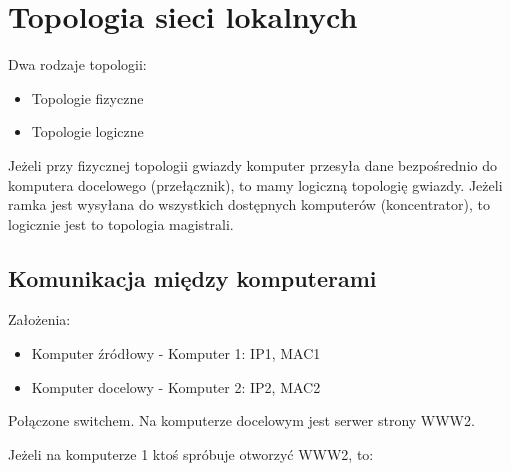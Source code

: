 \documentclass[a4paper]{article}
\begin{document}
\section{Topologia sieci lokalnych}
Dwa rodzaje topologii:
\begin{itemize}
    \item Topologie fizyczne
    \item Topologie logiczne
\end{itemize}

Jeżeli przy fizycznej topologii gwiazdy komputer przesyła dane bezpośrednio do komputera docelowego (przełącznik), to mamy logiczną topologię gwiazdy. Jeżeli ramka jest wysyłana do wszystkich dostępnych komputerów (koncentrator), to logicznie jest to topologia magistrali.

\subsection{Komunikacja między komputerami}

Założenia:
\begin{itemize}
    \item Komputer źródłowy - Komputer 1: IP1, MAC1
    \item Komputer docelowy - Komputer 2: IP2, MAC2
\end{itemize}
Połączone switchem. Na komputerze docelowym  jest serwer strony WWW2.

Jeżeli na komputerze 1 ktoś spróbuje otworzyć WWW2, to:
\end{document}
